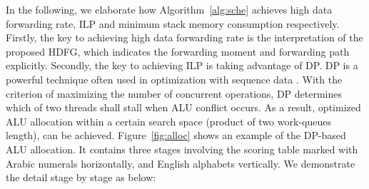 \indent
In the following, we elaborate how Algorithm~\ref{alg:sche} achieves high data forwarding rate, ILP and minimum stack memory consumption respectively.
Firstly, the key to achieving high data forwarding rate is the interpretation of the proposed HDFG, 
which indicates the forwarding moment and forwarding path explicitly.
\indent
Secondly, the key to achieving ILP is taking advantage of DP.
DP is a powerful technique often used in optimization with sequence data \cite{dpseq}.
With the criterion of maximizing the number of concurrent operations, DP determines which of two threads shall stall when ALU conflict occurs.
As a result, optimized ALU allocation within a certain search space (product of two work-queues length), can be achieved.
Figure~\ref{fig:alloc} shows an example of the DP-based ALU allocation.
It contains three stages involving the scoring table marked with Arabic numerals horizontally, and English alphabets vertically.
We demonstrate the detail stage by stage as below:
